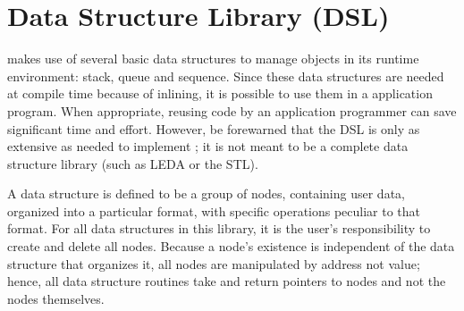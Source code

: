 \documentclass[openright,twoside]{report}
\begin{document}
\chapter{Data Structure Library (DSL)}
\label{s:DataStructureLibrary}
%

\uC makes use of several basic data structures to manage objects in its runtime environment: stack, queue and sequence.
Since these data structures are needed at compile time because of inlining, it is possible to use them in a \uC application program.
When appropriate, reusing code by an application programmer can save significant time and effort.
However, be forewarned that the \uC DSL is only as extensive as needed to implement \uC;
it is not meant to be a complete data structure library (such as LEDA or the STL).

A data structure is defined to be a group of nodes, containing user data, organized into a particular format, with specific operations peculiar to that format.
For all data structures in this library, it is the user's responsibility to create and delete all nodes.
Because a node's existence is independent of the data structure that organizes it, all nodes are manipulated by address not value;
hence, all data structure routines take and return pointers to nodes and not the nodes themselves.
\end{document}
